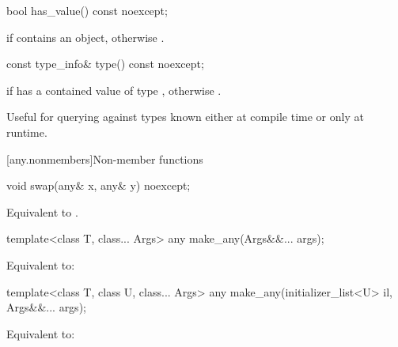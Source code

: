 %
\begin{itemdecl}
bool has_value() const noexcept;
\end{itemdecl}

\begin{itemdescr}
\pnum
\returns
{} if  contains an object, otherwise .
\end{itemdescr}

%
\begin{itemdecl}
const type_info& type() const noexcept;
\end{itemdecl}

\begin{itemdescr}
\pnum
\returns
{} if  has a contained value of type ,
otherwise .

\pnum
\begin{note}
Useful for querying against types known either at compile time or only at runtime.
\end{note}
\end{itemdescr}

[any.nonmembers]{Non-member functions}

%
\begin{itemdecl}
void swap(any& x, any& y) noexcept;
\end{itemdecl}

\begin{itemdescr}
\pnum
\effects
Equivalent to .
\end{itemdescr}

%
\begin{itemdecl}
template<class T, class... Args>
  any make_any(Args&&... args);
\end{itemdecl}

\begin{itemdescr}
\pnum
\effects
Equivalent to: 
\end{itemdescr}

%
\begin{itemdecl}
template<class T, class U, class... Args>
  any make_any(initializer_list<U> il, Args&&... args);
\end{itemdecl}

\begin{itemdescr}
\pnum
\effects
Equivalent to: 
\end{itemdescr}

